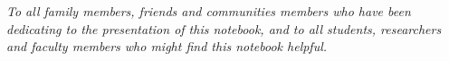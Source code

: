 \cleardoublepage
\thispagestyle{empty}
\begin{center}
\Large\itshape
To all family members, friends and communities members who have been dedicating to the presentation of this notebook, and to all students, researchers and faculty members who might find this notebook helpful.
\end{center}

